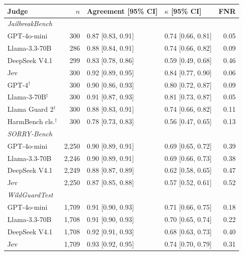 \begin{tabular}{lrllr}
\toprule
Judge & $n$ & Agreement [95\% CI] & $\kappa$ [95\% CI] & FNR \\
\midrule
\multicolumn{5}{l}{\emph{JailbreakBench}} \\
GPT-4o-mini & 300 & 0.87 [0.83, 0.91] & 0.74 [0.66, 0.81] & 0.05 \\
Llama-3.3-70B & 286 & 0.88 [0.84, 0.91] & 0.74 [0.66, 0.82] & 0.09 \\
DeepSeek V4.1 & 299 & 0.83 [0.78, 0.86] & 0.59 [0.49, 0.68] & 0.46 \\
Jev & 300 & 0.92 [0.89, 0.95] & 0.84 [0.77, 0.90] & 0.06 \\
GPT-4$^\dagger$ & 300 & 0.90 [0.86, 0.93] & 0.80 [0.72, 0.87] & 0.09 \\
Llama-3-70B$^\dagger$ & 300 & 0.91 [0.87, 0.93] & 0.81 [0.73, 0.87] & 0.05 \\
Llama Guard 2$^\dagger$ & 300 & 0.88 [0.83, 0.91] & 0.74 [0.66, 0.82] & 0.11 \\
HarmBench cls.$^\dagger$ & 300 & 0.78 [0.73, 0.83] & 0.56 [0.47, 0.65] & 0.13 \\
\midrule
\multicolumn{5}{l}{\emph{SORRY-Bench}} \\
GPT-4o-mini & 2,250 & 0.90 [0.89, 0.91] & 0.69 [0.65, 0.72] & 0.39 \\
Llama-3.3-70B & 2,246 & 0.90 [0.89, 0.91] & 0.69 [0.66, 0.73] & 0.38 \\
DeepSeek V4.1 & 2,249 & 0.88 [0.87, 0.89] & 0.62 [0.58, 0.65] & 0.47 \\
Jev & 2,250 & 0.87 [0.85, 0.88] & 0.57 [0.52, 0.61] & 0.52 \\
\midrule
\multicolumn{5}{l}{\emph{WildGuardTest}} \\
GPT-4o-mini & 1,709 & 0.91 [0.90, 0.93] & 0.71 [0.66, 0.75] & 0.18 \\
Llama-3.3-70B & 1,708 & 0.91 [0.90, 0.93] & 0.70 [0.65, 0.74] & 0.22 \\
DeepSeek V4.1 & 1,708 & 0.92 [0.91, 0.93] & 0.68 [0.63, 0.73] & 0.40 \\
Jev & 1,709 & 0.93 [0.92, 0.95] & 0.74 [0.70, 0.79] & 0.31 \\
\bottomrule
\end{tabular}
